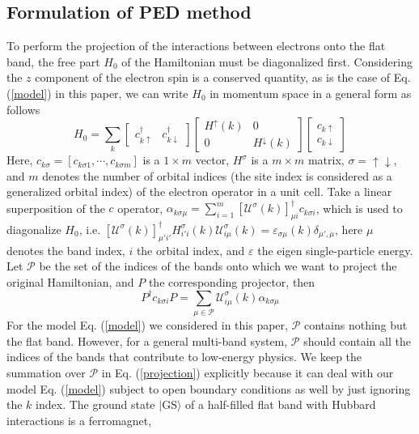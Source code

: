 \documentclass[amsmath,superscriptaddress,showpacs,aps,prb,twocolumn]{revtex4-1}
\begin{document}
\subsection{Formulation of PED method}
\par To perform the projection of the interactions between electrons onto the flat band, the free part $H_0$ of the Hamiltonian must be diagonalized first. Considering the $z$ component of the electron spin is a conserved quantity, as is the case of Eq. (\ref{model}) in this paper, we can write $H_0$ in momentum space in a general form as follows
\begin{equation}\label{H0}
H_0=\sum_k
\begin{bmatrix}
    c^\dagger_{k\uparrow} & c^\dagger_{k\downarrow}
\end{bmatrix}
\begin{bmatrix}
    H^{\uparrow}(k) & 0 \\
    0 & H^{\downarrow}(k)
\end{bmatrix}
\begin{bmatrix}
    c_{k\uparrow} \\
    c_{k\downarrow}
\end{bmatrix}
\end{equation}
Here, $c_{k\sigma}=\left[c_{k\sigma 1},\cdots,c_{k\sigma m}\right]$ is a $1\times m$ vector, $H^{\sigma}$ is a $m\times m$ matrix, $\sigma=\uparrow\downarrow$, and $m$ denotes the number of orbital indices (the site index is considered as a generalized orbital index) of the electron operator in a unit cell. Take a linear superposition of the $c$ operator, $\alpha_{k\sigma\mu}=\sum_{i=1}^m\left[\mathcal{U}^\sigma(k)\right]_{\mu i}^\dagger c_{k\sigma i}$, which is used to diagonalize $H_0$, i.e. $\left[\mathcal{U}^\sigma(k)\right]^\dagger_{\mu'i'}H^\sigma_{i'i}(k)\mathcal{U}^\sigma_{i\mu}(k)=\varepsilon_{\sigma\mu}(k)\delta_{\mu',\mu}$, here $\mu$ denotes the band index, $i$ the orbital index, and $\varepsilon$ the eigen single-particle energy. Let $\mathcal{P}$ be the set of the indices of the bands onto which we want to project the original Hamiltonian, and $P$ the corresponding projector, then
\begin{equation}\label{projection}
  P^\dagger c_{k\sigma i}P=\sum_{\mu\in\mathcal{P}}\mathcal{U}^\sigma_{i\mu}(k)\alpha_{k\sigma\mu}
\end{equation}
For the model Eq. (\ref{model}) we considered in this paper, $\mathcal{P}$ contains nothing but the flat band. However, for a general multi-band system, $\mathcal{P}$ should contain all the indices of the bands that contribute to low-energy physics. We keep the summation over $\mathcal{P}$ in Eq. (\ref{projection}) explicitly because it can deal with our model Eq. (\ref{model}) subject to open boundary conditions as well by just ignoring the $k$ index. The ground state $|\text{GS}\rangle$ of a half-filled flat band with Hubbard interactions is a ferromagnet,
\end{document}
